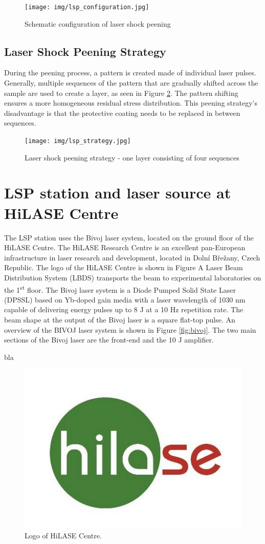 \begin{figure}[h]
    \centering
    \texttt{[image: img/lsp\_configuration.jpg]}
    \caption{Schematic configuration of laser shock peening}
    \label{fig:lspconfiguration}
\end{figure}

\subsection{Laser Shock Peening Strategy}
During the peening process, a pattern is created made of individual laser pulses. Generally, multiple sequences of the pattern that are gradually shifted across the sample are used to create a layer, as seen in Figure \ref{fig:lspstrategy}. The pattern shifting ensures a more homogeneous residual stress distribution. This peening strategy's disadvantage is that the protective coating needs to be replaced in between sequences.

\begin{figure}[h]
    \centering
    \texttt{[image: img/lsp\_strategy.jpg]}
    \caption{Laser shock peening strategy - one layer consisting of four sequences}
    \label{fig:lspstrategy}
\end{figure}

\section{LSP station and laser source at HiLASE Centre}

The LSP station uses the Bivoj laser system, located on the ground floor of the HiLASE Centre. The HiLASE Research Centre is an excellent pan-European infrastructure in laser research and development, located in Dolní Břežany, Czech Republic. The logo of the HiLASE Centre is shown in Figure A Laser Beam Distribution System (LBDS) transports the beam to
experimental laboratories on the 1\textsuperscript{st} floor. The Bivoj laser
system is a Diode Pumped Solid State Laser (DPSSL) based on
Yb-doped gain media with a laser wavelength of 1030 nm
capable of delivering energy pulses up to 8 J at a 10 Hz
repetition rate. The beam shape at the output of the Bivoj laser is a
square flat-top pulse. An overview of the BIVOJ laser system is shown in Figure \ref{fig:bivoj}. The two main sections of the Bivoj laser are
the front-end and the 10 J amplifier.

bla

\begin{figure}[h]
    \centering
    \includegraphics[width=0.6\linewidth]{img/hilase.jpg}
    \caption{Logo of HiLASE Centre.}
    \label{fig:lspconfiguration}
\end{figure}

